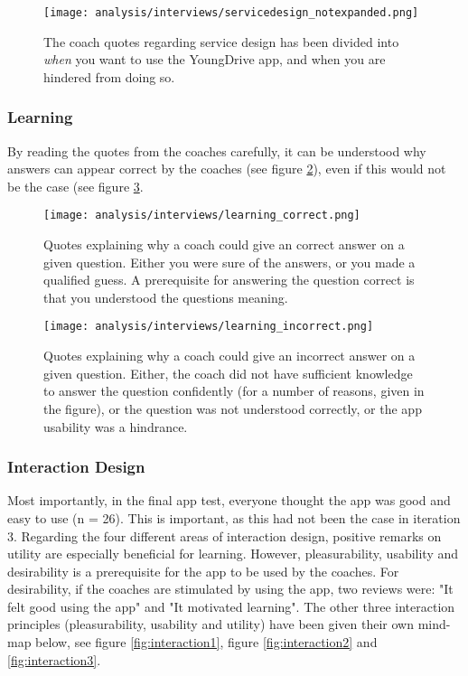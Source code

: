 \begin{figure}[h]
    \centering
    \texttt{[image: analysis/interviews/servicedesign\_notexpanded.png]}
    \caption{The coach quotes regarding service design has been divided into \textit{when} you want to use the YoungDrive app, and when you are hindered from doing so.}
    \label{fig:servicedesign}
\end{figure}

\clearpage

\subsubsection{Learning}\label{sec:interview-learning}

By reading the quotes from the coaches carefully, it can be understood why answers can appear correct by the coaches (see figure \ref{fig:learning1}), even if this would not be the case (see figure \ref{fig:learning2}.

\begin{figure}[h]
    \centering
    \texttt{[image: analysis/interviews/learning\_correct.png]}
    \caption{Quotes explaining why a coach could give an correct answer on a given question. Either you were sure of the answers, or you made a qualified guess. A prerequisite for answering the question correct is that you understood the questions meaning.}
    \label{fig:learning1}
\end{figure}

\begin{figure}[h]
    \centering
    \texttt{[image: analysis/interviews/learning\_incorrect.png]}
    \caption{Quotes explaining why a coach could give an incorrect answer on a given question. Either, the coach did not have sufficient knowledge to answer the question confidently (for a number of reasons, given in the figure), or the question was not understood correctly, or the app usability was a hindrance.}
    \label{fig:learning2}
\end{figure}

\clearpage

\subsubsection{Interaction Design}

Most importantly, in the final app test, everyone thought the app was good and easy to use (n = 26). This is important, as this had not been the case in iteration 3. Regarding the four different areas of interaction design, positive remarks on utility are especially beneficial for learning. However, pleasurability, usability and desirability is a prerequisite for the app to be used by the coaches. For desirability, if the coaches are stimulated by using the app, two reviews were: "It felt good using the app" and "It motivated learning". The other three interaction principles (pleasurability, usability and utility) have been given their own mind-map below, see figure \ref{fig:interaction1}, figure \ref{fig:interaction2} and \ref{fig:interaction3}.

